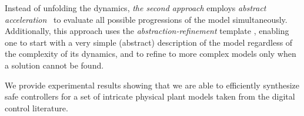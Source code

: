 \documentclass[twocolumn]{autart}    %
\newcommand{\addtodo}[1]{\textcolor{red}{[#1]}}
\begin{document}
\ifx\axelerator
Instead of unfolding the dynamics, \emph{the second approach}
employs \emph{abstract acceleration}~\cite{cattaruzza2015unbounded} to
evaluate all possible progressions of the model simultaneously. 
Additionally, this approach uses the \emph{abstraction-refinement} template \cite{DBLP:conf/cav/ClarkeGJLV00},
enabling one to start with a very simple (abstract) description of the model 
regardless of the complexity of its dynamics, and to refine to more complex models only 
when a solution cannot be found.
\fi

We provide experimental results showing that we are able to
efficiently synthesize safe controllers for a set of intricate physical
plant models taken from the digital control literature.
\end{document}
